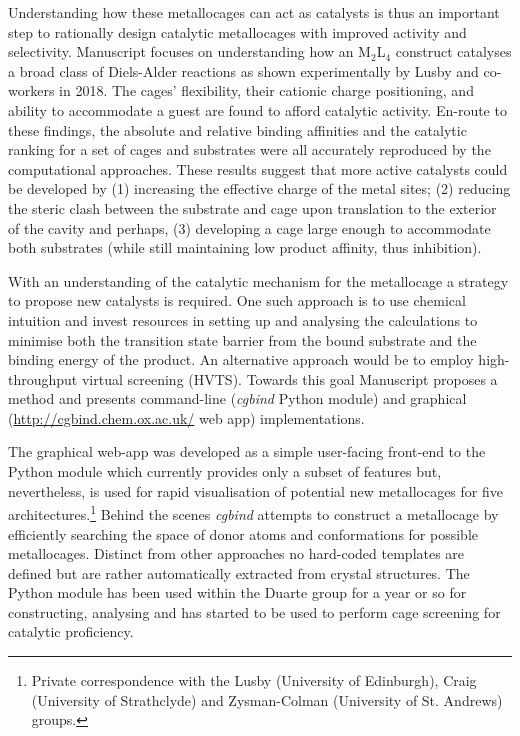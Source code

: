 \documentclass[../../main.tex]{subfiles}
\begin{document}
Understanding how these metallocages can act as catalysts is thus an important step to rationally design catalytic metallocages with improved activity and selectivity. Manuscript  focuses on understanding how an M$_2$L$_4$ construct catalyses a broad class of Diels-Alder reactions as shown experimentally by Lusby and co-workers in 2018.\cite{MartCentelles2018} The cages' flexibility, their cationic charge positioning, and ability to accommodate a guest are found to afford catalytic activity. En-route to these findings, the absolute and relative binding affinities and the catalytic ranking for a set of cages and substrates were all accurately reproduced by the computational approaches. These results suggest that more active catalysts could be developed by (1) increasing the effective charge of the metal sites; (2) reducing the steric clash between the substrate and cage upon translation to the exterior of the cavity and perhaps, (3) developing a cage large enough to accommodate both substrates (while still maintaining low product affinity, thus inhibition).

With an understanding of the catalytic mechanism for the metallocage a strategy to propose new catalysts is required. One such approach is to use chemical intuition and invest resources in setting up and analysing the calculations to minimise both the transition state barrier from the bound substrate and the binding energy of the product. An alternative approach would be to employ high-throughput virtual screening (HVTS). Towards this goal Manuscript  proposes a method and presents command-line (\emph{cgbind} Python module) and graphical ({\url{http://cgbind.chem.ox.ac.uk/}} web app)  implementations.

The graphical web-app was developed as a simple user-facing front-end to the Python module which currently provides only a subset of features but, nevertheless, is used for rapid visualisation of potential new metallocages for five architectures.\footnote{Private correspondence with the Lusby (University of Edinburgh), Craig (University of Strathclyde) and Zysman-Colman (University of St. Andrews) groups.} Behind the scenes \emph{cgbind} attempts to construct a metallocage by efficiently searching the space of donor atoms and conformations for possible metallocages. Distinct from other approaches\cite{Turcani2018} no hard-coded templates are defined but are rather automatically extracted from crystal structures. The Python module has been used within the Duarte group for a year or so for constructing, analysing and has started to be used to perform cage screening for catalytic proficiency.

\clearpage
\end{document}

